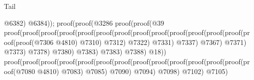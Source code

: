 \begin{lexlean}{Tail}
\begin{coremodule}
                                                          @6382)
                                                        @6384));
                                                  proof(proof(@3286
                                                        proof(proof(@39
                                                              proof(proof(proof(proof(proof(proof(proof(proof(proof(proof(proof(proof(proof(proof(proof(@7306
                                                                                              @4810)
                                                                                            @7310)
                                                                                          @7312)
                                                                                        @7322)
                                                                                      @7331)
                                                                                    @7337)
                                                                                  @7367)
                                                                                @7371)
                                                                              @7373)
                                                                            @7378)
                                                                          @7380)
                                                                        @7383)
                                                                      @7383)
                                                                    @7388)
                                                                  @18))
                                                            proof(proof(proof(proof(proof(proof(proof(proof(proof(proof(proof(proof(proof(proof(@7080
                                                                                          @4810)
                                                                                        @7083)
                                                                                      @7085)
                                                                                    @7090)
                                                                                  @7094)
                                                                                @7098)
                                                                              @7102)
                                                                            @7105)

\end{coremodule}
\end{lexlean}
